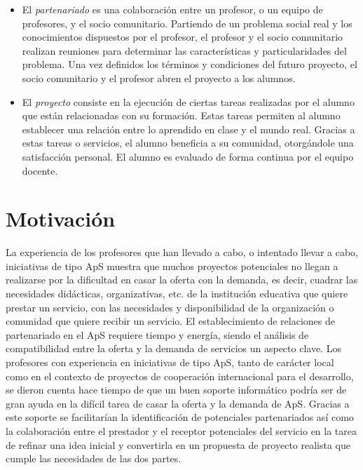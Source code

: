 \documentclass[11pt]{book}
\begin{document}
\begin{itemize}
	\item El \emph{partenariado} es una colaboración entre un profesor, o un equipo de profesores, y el socio comunitario. Partiendo de un problema social real y los conocimientos dispuestos por el profesor, el profesor y el socio comunitario realizan reuniones para determinar las características y particularidades del problema. Una vez definidos los términos y condiciones del futuro proyecto, el socio comunitario y el profesor abren el proyecto a los alumnos.
	\item El \emph{proyecto} consiste en la ejecución de ciertas tareas realizadas por el alumno que están relacionadas con su formación. Estas tareas permiten al alumno establecer una relación entre lo aprendido en clase y el mundo real. Gracias a estas tareas o servicios, el alumno beneficia a su comunidad, otorgándole una satisfacción personal. El alumno es evaluado de forma continua por el equipo docente.
\end{itemize}
\section{Motivación}\label{cap:cont-motidvacion}
La experiencia de los profesores que han llevado a cabo, o intentado
llevar a cabo, iniciativas de tipo ApS muestra
que muchos proyectos potenciales no llegan a realizarse por la
dificultad en casar la oferta con la demanda, es decir, cuadrar las
necesidades didácticas, organizativas, etc. de la institución educativa
que quiere prestar un servicio, con las necesidades y disponibilidad de
la organización o comunidad que quiere recibir un servicio. El
establecimiento de relaciones de partenariado en el ApS requiere tiempo
y energía, siendo el análisis de compatibilidad entre la oferta y la
demanda de servicios un aspecto clave. Los profesores con experiencia en
iniciativas de tipo ApS, tanto de carácter local como en el contexto de
proyectos de cooperación internacional para el desarrollo, se dieron
cuenta hace tiempo de que un buen soporte informático podría ser de gran
ayuda en la difícil tarea de casar la oferta y la demanda de ApS.
Gracias a este soporte se facilitarían la identificación de potenciales
partenariados así como la colaboración entre el prestador y el receptor
potenciales del servicio en la tarea de refinar una idea inicial y
convertirla en un propuesta de proyecto realista que cumple las
necesidades de las dos partes.\\\\
\end{document}
